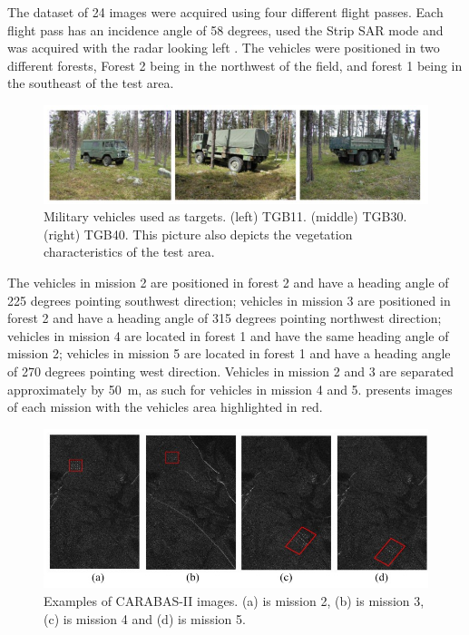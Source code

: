 The dataset of 24 images were acquired using four different flight passes. Each 
flight pass has an incidence angle of 58 degrees, used the Strip SAR mode and was acquired with the radar looking left \cite{ 75,76}.
The vehicles were positioned in two different forests, Forest 2 being in the northwest of the field, and forest 1 being in the
southeast of the test area. 

\begin{figure}[H]
    \centering
    \includegraphics[scale=0.9]{chapter6/carabas_vehicles_fisico.jpg}
    \caption{Military vehicles used as targets. (left) TGB11. (middle) TGB30. (right) TGB40. 
    This picture also depicts the vegetation characteristics of the test area.}
    \label{fig:veiculos}
\end{figure}

The vehicles in mission 2 are positioned in forest 2 and have a heading angle of 225 degrees pointing southwest direction;
vehicles in mission 3 are positioned in forest 2 and have a heading angle of 315 degrees pointing northwest direction;
vehicles in mission 4 are located in forest 1 and have the same heading angle of mission 2;
vehicles in mission 5 are located in forest 1 and have a heading angle of 270 degrees pointing west direction.
Vehicles in mission 2 and 3 are separated approximately by 50 m, as such for vehicles in mission 4 and 5.
 presents images of each mission with the vehicles area highlighted in red.

\begin{figure}[H]
    \centering
    \includegraphics{chapter6/carabas_vehicles.jpg}
    \caption{Examples of CARABAS-II images. (a) is mission 2, (b) is mission 3, (c) is mission 4 and (d)
    is mission 5.}
    \label{fig:carabas_vehicles}
\end{figure}


